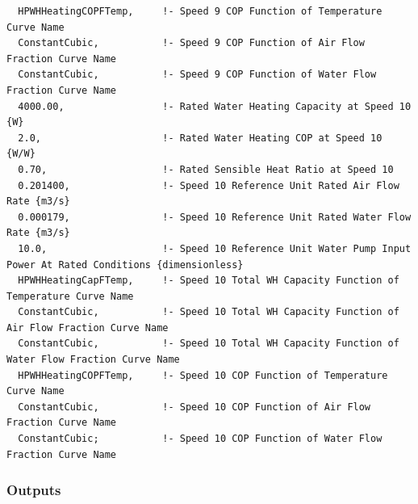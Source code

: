 \begin{lstlisting}
  HPWHHeatingCOPFTemp,     !- Speed 9 COP Function of Temperature Curve Name
  ConstantCubic,           !- Speed 9 COP Function of Air Flow Fraction Curve Name
  ConstantCubic,           !- Speed 9 COP Function of Water Flow Fraction Curve Name
  4000.00,                 !- Rated Water Heating Capacity at Speed 10 {W}
  2.0,                     !- Rated Water Heating COP at Speed 10 {W/W}
  0.70,                    !- Rated Sensible Heat Ratio at Speed 10
  0.201400,                !- Speed 10 Reference Unit Rated Air Flow Rate {m3/s}
  0.000179,                !- Speed 10 Reference Unit Rated Water Flow Rate {m3/s}
  10.0,                    !- Speed 10 Reference Unit Water Pump Input Power At Rated Conditions {dimensionless}
  HPWHHeatingCapFTemp,     !- Speed 10 Total WH Capacity Function of Temperature Curve Name
  ConstantCubic,           !- Speed 10 Total WH Capacity Function of Air Flow Fraction Curve Name
  ConstantCubic,           !- Speed 10 Total WH Capacity Function of Water Flow Fraction Curve Name
  HPWHHeatingCOPFTemp,     !- Speed 10 COP Function of Temperature Curve Name
  ConstantCubic,           !- Speed 10 COP Function of Air Flow Fraction Curve Name
  ConstantCubic;           !- Speed 10 COP Function of Water Flow Fraction Curve Name
\end{lstlisting}


\subsubsection{Outputs}\label{vshpwhheating-outputs}

